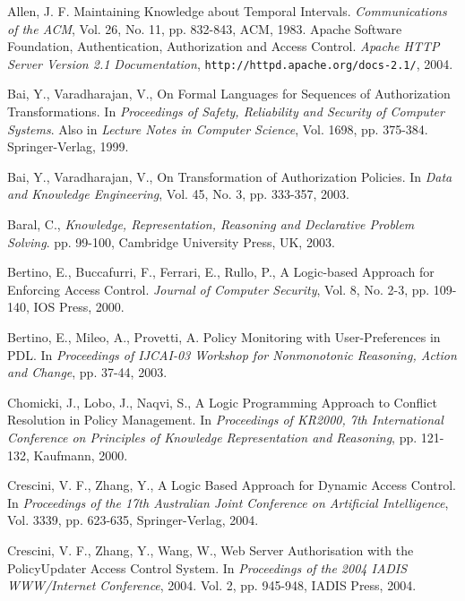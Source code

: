 \documentclass[glov2,twocolumn,final]{svjour2}
\begin{document}
  \begin{thebibliography}{5}
      Allen, J. F.
      Maintaining Knowledge about Temporal Intervals.
      {\em Communications of the ACM},
      Vol. 26, No. 11, pp. 832-843, ACM, 1983.
      Apache Software Foundation,
      Authentication, Authorization and Access Control.
      {\em Apache HTTP Server Version 2.1 Documentation},
      {\tt \scriptsize http://httpd.apache.org/docs-2.1/}, 2004.

      Bai, Y., Varadharajan, V.,
      On Formal Languages for Sequences of Authorization Transformations.
      In {\em Proceedings of Safety, Reliability and Security of Computer
      Systems}. Also in {\em Lecture Notes in Computer Science},
      Vol. 1698, pp. 375-384. Springer-Verlag, 1999.

      Bai, Y., Varadharajan, V.,
      On Transformation of Authorization Policies.
      In {\em Data and Knowledge Engineering},
      Vol. 45, No. 3, pp. 333-357, 2003.

      Baral, C.,
      {\em Knowledge, Representation, Reasoning and Declarative Problem
      Solving}.
      pp. 99-100, Cambridge University Press, UK, 2003.

      Bertino, E., Buccafurri, F., Ferrari, E., Rullo, P.,
      A Logic-based Approach for Enforcing Access Control.
      {\em Journal of Computer Security},
      Vol. 8, No. 2-3, pp. 109-140, IOS Press, 2000.

      Bertino, E., Mileo, A., Provetti, A.
      Policy Monitoring with User-Preferences in PDL.
      In {\em Proceedings of IJCAI-03 Workshop for Nonmonotonic Reasoning,
      Action and Change},
      pp. 37-44, 2003.

      Chomicki, J., Lobo, J., Naqvi, S.,
      A Logic Programming Approach to Conflict Resolution in Policy Management.
      In {\em Proceedings of KR2000, 7th International Conference on Principles
      of Knowledge Representation and Reasoning},
      pp. 121-132, Kaufmann, 2000.

      Crescini, V. F., Zhang, Y.,
      A Logic Based Approach for Dynamic Access Control.
      In {\em Proceedings of the 17th Australian Joint Conference on Artificial
      Intelligence},
      Vol. 3339, pp. 623-635, Springer-Verlag, 2004.

      Crescini, V. F., Zhang, Y., Wang, W.,
      Web Server Authorisation with the PolicyUpdater Access Control System.
      In {\em Proceedings of the 2004 IADIS WWW/Internet Conference},
      2004. Vol. 2, pp. 945-948, IADIS Press, 2004.


\end{thebibliography}
\end{document}
